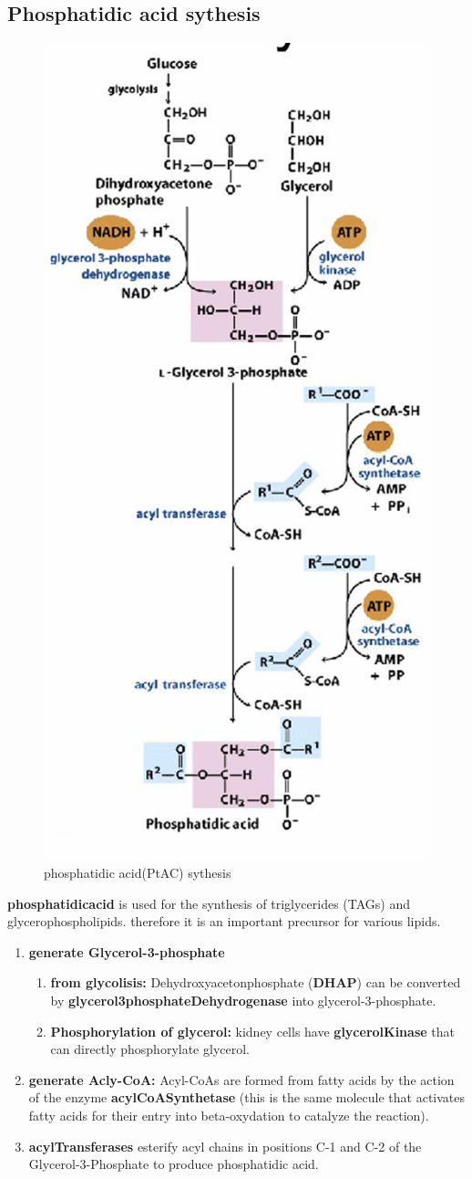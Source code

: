 \documentclass[../main.tex]{subfiles}
\begin{document}
\subsection{Phosphatidic acid sythesis}
\begin{figure}[H]
    \centering
    \includegraphics[width=0.25\linewidth]{phosphatidicAcid.png}
    \caption{phosphatidic acid(PtAC) sythesis}
    \label{fig:enter-label}
\end{figure}
\textbf{\gls{phosphatidicacid}} is used for the synthesis of triglycerides (TAGs) and glycerophospholipids. therefore it is an important precursor for various lipids. 
\begin{enumerate}
    \item \textbf{generate Glycerol-3-phosphate}
    \begin{enumerate}
        \item \textbf{from glycolisis:} Dehydroxyacetonphosphate (\textbf{DHAP}) can be converted by \textbf{\gls{glycerol3phosphateDehydrogenase}} into glycerol-3-phosphate.

        \item \textbf{Phosphorylation of glycerol:} kidney cells have \textbf{\gls{glycerolKinase}} that can directly phosphorylate glycerol.
    \end{enumerate}
    \item \textbf{generate Acly-CoA:} Acyl-CoAs are formed from fatty acids by the action of the enzyme \textbf{\gls{acylCoASynthetase}} (this is the same molecule that activates fatty acids for their entry into beta-oxydation to catalyze the reaction).

    \item \textbf{\gls{acylTransferases}} esterify acyl chains in positions C-1 and C-2 of the Glycerol-3-Phosphate to produce phosphatidic acid.
\end{enumerate}
\end{document}
